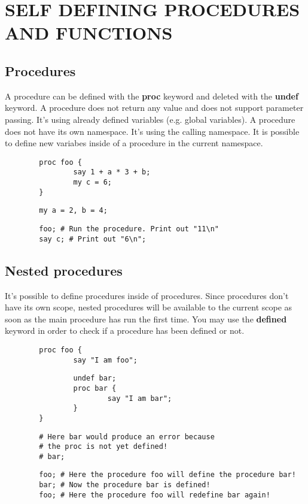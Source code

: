 \section{SELF DEFINING PROCEDURES AND FUNCTIONS\label{SELF_DEFINING_PROCEDURES_AND_FUNCTIONS}}
\subsection*{Procedures\label{Procedures}}


A procedure can be defined with the \textbf{proc} keyword and deleted with the \textbf{undef} keyword.  A procedure does not return any value and does not support parameter passing. It's using already defined variables (e.g. global variables). A procedure does not have its own namespace. It's using the calling namespace. It is possible to define new variabes inside of a procedure in the current namespace.

\begin{verbatim}
        proc foo {
                say 1 + a * 3 + b;
                my c = 6;
        }
\end{verbatim}
\begin{verbatim}
        my a = 2, b = 4;
\end{verbatim}
\begin{verbatim}
        foo; # Run the procedure. Print out "11\n"
        say c; # Print out "6\n";
\end{verbatim}
\subsection*{Nested procedures\label{Nested_procedures}}


It's possible to define procedures inside of procedures. Since procedures don't
have its own scope, nested procedures will be available to the current scope as
soon as the main procedure has run the first time. You may use the \textbf{defined}
keyword in order to check if a procedure has been defined or not.

\begin{verbatim}
        proc foo {
                say "I am foo";
\end{verbatim}
\begin{verbatim}
                undef bar;
                proc bar {
                        say "I am bar";
                }
        }
\end{verbatim}
\begin{verbatim}
        # Here bar would produce an error because 
        # the proc is not yet defined!
        # bar;
\end{verbatim}
\begin{verbatim}
        foo; # Here the procedure foo will define the procedure bar!
        bar; # Now the procedure bar is defined!
        foo; # Here the procedure foo will redefine bar again!
\end{verbatim}
